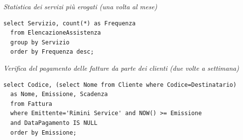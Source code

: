 \noindent{}
\newline\newline

\noindent\textit{Statistica dei servizi più erogati (una volta al mese)}
\begin{verbatim}
select Servizio, count(*) as Frequenza
  from ElencazioneAssistenza
  group by Servizio
  order by Frequenza desc;
\end{verbatim}
\vspace{0.5cm}

\noindent{}
\newline\newline

\noindent\textit{Verifica del pagamento delle fatture da parte dei clienti (due volte a settimana)}
\begin{verbatim}
select Codice, (select Nome from Cliente where Codice=Destinatario)
  as Nome, Emissione, Scadenza
  from Fattura
  where Emittente='Rimini Service' and NOW() >= Emissione
  and DataPagamento IS NULL
  order by Emissione;
\end{verbatim}
\vspace{0.5cm}

\noindent{}
\newline\newline

